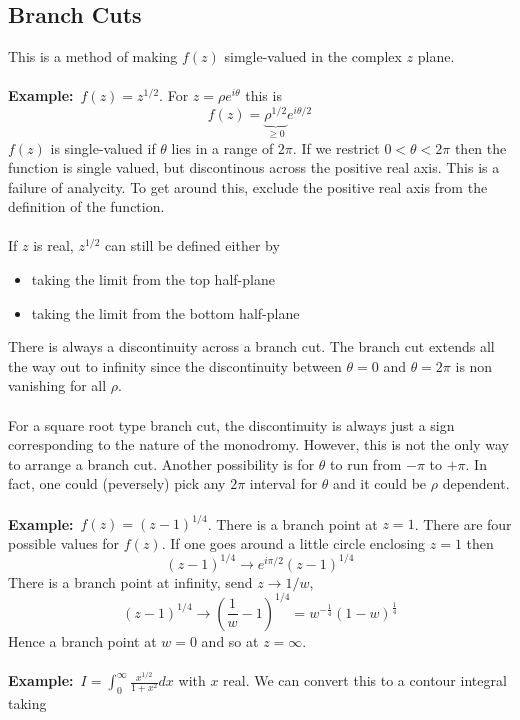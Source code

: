 \documentclass{article}
\newcommand{\example}{\textbf{Example:}}
\begin{document}
\subsection*{Branch Cuts}
This is a method of making $f(z)$ simgle-valued in the complex $z$ plane.
\\
\\
\example\ $f(z) = z^{1/2} $. For $z = \rho e^{i\theta}$ this is
\[f(z) = \underbrace{\rho^{1/2}}_{\geq 0} e^{i\theta/2} \]
$f(z)$ is single-valued if $\theta$ lies in a range of $2\pi$.
If we restrict $0 < \theta < 2\pi$ then the function is single valued, 
but discontinous across the positive real axis. This is a failure of 
analycity.
To get around this, exclude the positive real axis from the definition of the
function.
\\
\\
If $z$ is real, $z^{1/2}$ can still be defined either by
\begin{itemize}
\item taking the limit from the top half-plane
\item taking the limit from the bottom half-plane
\end{itemize}
There is always a discontinuity across a branch cut. The branch cut extends
all the way out to infinity since the discontinuity between $\theta =0$ and
$\theta = 2 \pi$ is non vanishing for all $\rho$.
\\
\\
For a square root type branch cut, the discontinuity is always just a sign 
corresponding to the nature of the monodromy. However, this is not the only
way to arrange a branch cut. Another possibility is for $\theta$ to run from
$-\pi$ to $+\pi$. In fact, one could (peversely) pick any $2\pi$ interval for
$\theta$ and it could be $\rho$ dependent.
\\
\\
\example\ $f(z) = (z-1)^{1/4} $. There is a branch point at $z=1$. There are
four possible values for $f(z)$. If one goes around a little circle enclosing
$z=1$ then
\[ (z-1)^{1/4} \to e^{i\pi /2} (z-1)^{1/4}\] 
There is a branch point at infinity, send $z \to 1/w$,
\[ (z-1)^{1/4} \to \left( \frac{1}{w} -1 \right) ^{1/4} =
w^{-\frac{1}{4}} ( 1-w)^{\frac{1}{4}} \]
Hence a branch point at $w=0$ and so at $z=\infty$.
\\
\\
\example\ $\displaystyle I = \int^{\infty}_0 \frac{x^{1/2}}{1+x^2} dx$
with $x$ real. We can convert this to a contour integral taking
\end{document}
